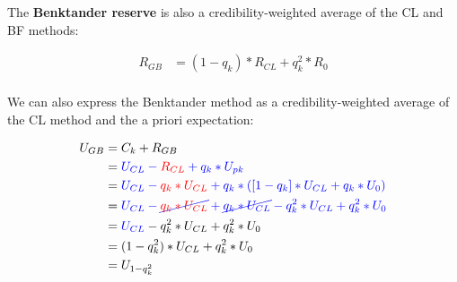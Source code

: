 \documentclass{article}
\begin{document}
The \textbf{Benktander reserve} is also a credibility-weighted average of the CL
and BF methods:

\begin{equation}
    \begin{aligned}
    R_{GB} &= (1-q_k) * R_{CL} + q_k^2 * R_0 \\
    \end{aligned}
\end{equation}

We can also express the Benktander method as a credibility-weighted average of
the CL method and the a priori expectation:

\begin{equation}
    \begin{aligned}
    U_{GB} &= C_k  + R_{GB} \\
    &= \color{blue}{U_{CL} - \color{red}R_{CL}}  + q_k * U_{pk} \\
    &= \color{blue}{U_{CL} - \color{red}q_k * U_{CL}}  + q_k * ([1-q_k] * U_{CL} + q_k * U_0) \\
    &= \color{blue}{U_{CL} - \cancel{\color{red}q_k * U_{CL}}}  + \cancel{q_k * U_{CL}} - q_k^2 * U_{CL} + q_k^2 * U_0 \\
    &= \color{blue}{U_{CL}}   \color{black}- q_k^2 * U_{CL} + q_k^2 * U_0 \\
    &= (1-q_k^2) * U_{CL} + q_k^2 * U_0 \\
    &= U_{1-q_k^2}
    \end{aligned}            
\end{equation}
\end{document}
